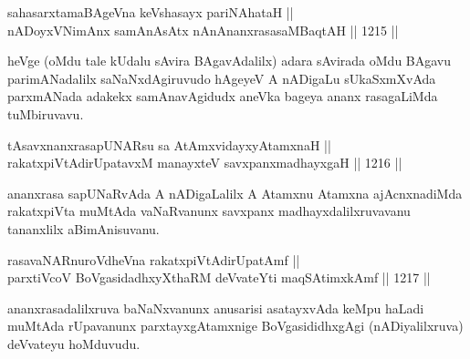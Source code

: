 
\begin{shl}
sahasarxtamaBAgeVna keVshasayx pariNAhataH || \\
nADoyxV\s NimAnx samAnAsAtx nAnAnanxrasasaMBaqtAH \hfill || 1215 ||  
\end{shl}

\begin{artha}
heVge (oMdu tale kUdalu sAvira BAgavAdalilx) adara sAvirada oMdu BAgavu parimANadalilx saNaNxdAgiruvudo hAgeyeV A nADigaLu sUkaSxmXvAda parxmANada adakekx samAnavAgidudx aneVka bageya ananx rasagaLiMda tuMbiruvavu.
\end{artha}


\begin{shl}
tAsavxnanxrasapUNARsu sa AtAmx\s vidayxyA\s \s tamxnaH || \\
rakatxpiVtAdirUpatavxM manayxteV savxpanxmadhayxgaH \hfill || 1216 ||  
\end{shl}

\begin{artha}
ananxrasa sapUNaRvAda A nADigaLalilx A Atamxnu Atamxna ajAcnxnadiMda rakatxpiVta muMtAda vaNaRvanunx savxpanx madhayxdalilxruvavanu tananxlilx aBimAnisuvanu.
\end{artha}

\begin{shl}
rasavaNARnuroVdheVna rakatxpiVtAdirUpatAmf || \\
parxtiVcoV BoVgasidadhxyXthaRM deVvateYti maqSAtimxkAmf \hfill || 1217 ||  
\end{shl}

\begin{artha}
ananxrasadalilxruva baNaNxvanunx anusarisi asatayxvAda keMpu haLadi muMtAda rUpavanunx parxtayxgAtamxnige BoVgasididhxgAgi (nADiyalilxruva) deVvateyu hoMduvudu.
\end{artha}


